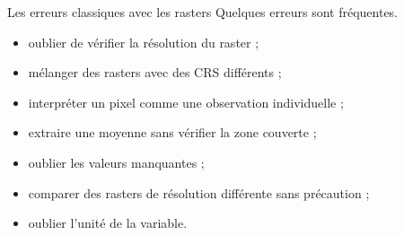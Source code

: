 \documentclass[
  10pt,
  ignorenonframetext,
]{beamer}
\begin{document}
\begin{frame}{Les erreurs classiques avec les rasters}
\label{les-erreurs-classiques-avec-les-rasters}
Quelques erreurs sont fréquentes.

\begin{itemize}
  \item oublier de vérifier la résolution du raster ;
  \item mélanger des rasters avec des CRS différents ;
  \item interpréter un pixel comme une observation individuelle ;
  \item extraire une moyenne sans vérifier la zone couverte ;
  \item oublier les valeurs manquantes ;
  \item comparer des rasters de résolution différente sans précaution ;
  \item oublier l’unité de la variable.
\end{itemize}
\end{frame}
\end{document}
